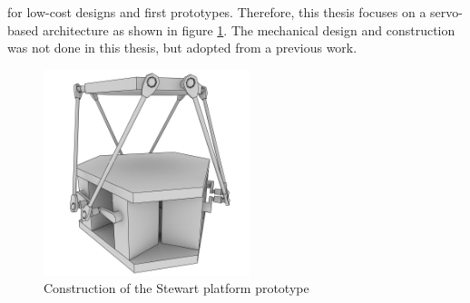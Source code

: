 for low-cost designs and first prototypes. Therefore, this thesis focuses on a
servo-based architecture as shown in figure
\ref{fig:stewart}. The mechanical design and construction was not done in this
thesis, but adopted from a previous work.
\begin{figure}
	\centering
	\includegraphics[width=6cm]{../figures/stewart}
	\caption{Construction of the Stewart platform prototype}
	\label{fig:stewart}
\end{figure}

